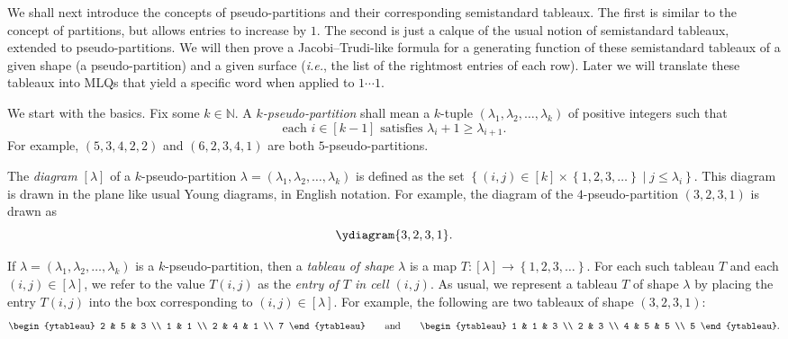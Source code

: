 \documentclass[reqno]{amsart}
\newcommand{\0}{\phantom{c}}
\newcommand{\diag}[1]{\left[#1\right]} %
\newcommand{\NN}{\mathbb{N}}
\newcommand{\set}[1]{\left\{ #1 \right\}}
\newcommand{\tup}[1]{\left( #1 \right)}
\newcommand{\ive}[1]{\left[ #1 \right]}
\newcommand{\defn}[1]{{\color{darkred}\emph{#1}}} %
\theoremstyle{plain}
\theoremstyle{definition}
\numberwithin{equation}{section}
\begin{document}
We shall next introduce the concepts of pseudo-partitions and their corresponding semistandard tableaux.
The first is similar to the concept of partitions, but allows entries to increase by $1$.
The second is just a calque of the usual notion of semistandard tableaux, extended to pseudo-partitions.
We will then prove a Jacobi--Trudi-like formula for a generating function of these semistandard tableaux of a given shape (a pseudo-partition) and a given surface (\textit{i.e.}, the list of the rightmost entries of each row). Later we will translate these tableaux into MLQs that yield a specific word when applied to $1\dotsm 1$.

We start with the basics.
Fix some $k \in \NN$.
A \defn{$k$-pseudo-partition} shall mean a $k$-tuple $\tup{\lambda_1, \lambda_2, \dotsc, \lambda_k}$ of positive integers such that
\[
\text{each } i \in \ive{k-1} \text{ satisfies } \lambda_i + 1 \geq \lambda_{i+1}.
\]
For example, $\tup{5,3,4,2,2}$ and $\tup{6,2,3,4,1}$ are both $5$-pseudo-partitions.

The \defn{diagram $\diag{\lambda}$} of a $k$-pseudo-partition $\lambda = \tup{\lambda_1, \lambda_2, \dotsc,\lambda_k}$ is defined as the set
$\set{  \left(  i,j\right)  \in \ive{k} \times \set{ 1,2,3,\ldots }  \mid  j \leq \lambda_i }$.
This diagram is drawn in the plane like usual Young diagrams, in English notation.
For example, the diagram of the $4$-pseudo-partition $\tup{3,2,3,1}$ is drawn as
\[
\ydiagram{3,2,3,1}.
\]


If $\lambda = \tup{\lambda_1, \lambda_2, \dotsc, \lambda_k}$ is a $k$-pseudo-partition, then a \defn{tableau of shape $\lambda$} is a map $T \colon \diag{\lambda} \to \set{1,2,3,\ldots}$.
For each such tableau $T$ and each $(i,j) \in \diag{\lambda}$, we refer to the value $T(i,j)$ as the \defn{entry of $T$ in cell $\left(i,j\right)$}.
As usual, we represent a tableau $T$ of shape $\lambda$ by placing the entry $T(i,j)$ into the box corresponding to $(i,j) \in \diag{\lambda}$.
For example, the following are two tableaux of shape $\tup{3,2,3,1}$:
\begin{equation}
\label{eq.tableau.exas}
\begin{ytableau} 2 & 5 & 3 \\ 1 & 1 \\ 2 & 4 & 1 \\ 7 \end{ytableau}\qquad
\text{and}\qquad
\begin{ytableau} 1 & 1 & 3 \\ 2 & 3 \\ 4 & 5 & 5 \\ 5 \end{ytableau}.
\end{equation}
\end{document}
